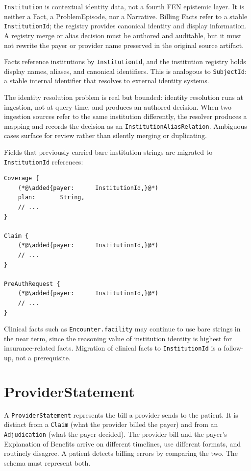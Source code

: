 \documentclass[11pt]{article}
\newcommand{\added}[1]{\textcolor{accentblue}{#1}}
\begin{document}
\texttt{Institution} is contextual identity data, not a fourth FEN
epistemic layer. It is neither a Fact, a ProblemEpisode, nor a Narrative.
Billing Facts refer to a stable \texttt{InstitutionId}; the registry provides
canonical identity and display information. A registry merge or alias decision
must be authored and auditable, but it must not rewrite the payer or provider
name preserved in the original source artifact.

Facts reference institutions by \texttt{InstitutionId}, and the
institution registry holds display names, aliases, and canonical
identifiers. This is analogous to \texttt{SubjectId}: a stable internal
identifier that resolves to external identity systems.

The identity resolution problem is real but bounded: identity
resolution runs at ingestion, not at query time, and produces an
authored decision. When two ingestion sources refer to the same
institution differently, the resolver produces a mapping and records
the decision as an \texttt{InstitutionAliasRelation}. Ambiguous cases
surface for review rather than silently merging or duplicating.

Fields that previously carried bare institution strings are migrated to
\texttt{InstitutionId} references:

\begin{lstlisting}
Coverage {
    (*@\added{payer:      InstitutionId,}@*)
    plan:       String,
    // ...
}

Claim {
    (*@\added{payer:      InstitutionId,}@*)
    // ...
}

PreAuthRequest {
    (*@\added{payer:      InstitutionId,}@*)
    // ...
}
\end{lstlisting}

Clinical facts such as \texttt{Encounter.facility} may continue to use
bare strings in the near term, since the reasoning value of institution
identity is highest for insurance-related facts. Migration of clinical
facts to \texttt{InstitutionId} is a follow-up, not a prerequisite.

\section{ProviderStatement}
\label{sec:provider-statement}

A \texttt{ProviderStatement} represents the bill a provider sends to the
patient. It is distinct from a \texttt{Claim} (what the provider billed the
payer) and from an \texttt{Adjudication} (what the payer decided). The
provider bill and the payer's Explanation of Benefits arrive on different
timelines, use different formats, and routinely disagree. A patient
detects billing errors by comparing the two. The schema must represent
both.
\end{document}
